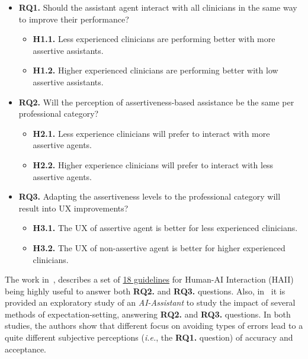 \begin{itemize}
\item {\bf RQ1.} Should the assistant agent interact with all clinicians in the same way to improve their performance?
\begin{itemize}
\item {\bf H1.1.} Less experienced clinicians are performing better with more assertive assistants.
\item {\bf H1.2.} Higher experienced clinicians are performing better with low assertive assistants.
\end{itemize}
\item {\bf RQ2.} Will the perception of assertiveness-based assistance be the same per professional category?
\begin{itemize}
\item {\bf H2.1.} Less experience clinicians will prefer to interact with more assertive agents.
\item {\bf H2.2.} Higher experience clinicians will prefer to interact with less assertive agents.
\end{itemize}
\item {\bf RQ3.} Adapting the assertiveness levels to the professional category will result into UX improvements?
\begin{itemize}
\item {\bf H3.1.} The UX of assertive agent is better for less experienced clinicians.
\item {\bf H3.2.} The UX of non-assertive agent is better for higher experienced clinicians.
\end{itemize}
\end{itemize}

The work in~\cite{10.1145/3290605.3300233}, describes a set of \underline{18 guidelines} for Human-AI Interaction (HAII) being highly useful to answer both {\bf RQ2.} and {\bf RQ3.} questions.
Also, in~\cite{Kocielnik:2019:YAI:3290605.3300641} it is provided  an exploratory study of an {\it AI-Assistant} to study the impact of several methods of expectation-setting, answering {\bf RQ2.} and {\bf RQ3.} questions.
In both studies, the authors show that different focus on avoiding types of errors lead to a quite different subjective perceptions ({\it i.e.}, the {\bf RQ1.} question) of accuracy and acceptance.

\break